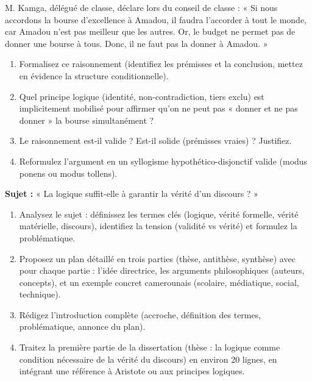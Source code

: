 \documentclass[11pt]{article}
\newcommand{\cle}[1]{{\popxbold\color{popdark}#1}}
\newcounter{popsec}
\newcounter{popsub}
\newcommand{\courssub}[1]{%
  \stepcounter{popsub}%
  \par\vspace{9pt}\noindent{\popxbold\fontsize{11.5}{13}\selectfont\color{popink}{\color{poporange}\thepopsec.\thepopsub}\hspace{6pt}#1}\par\nopagebreak\vspace{4pt}
}
\begin{document}
\begin{exercice}
M. Kamga, délégué de classe, déclare lors du conseil de classe : « Si nous accordons la bourse d'excellence à Amadou, il faudra l'accorder à tout le monde, car Amadou n'est pas meilleur que les autres. Or, le budget ne permet pas de donner une bourse à tous. Donc, il ne faut pas la donner à Amadou. »
\begin{enumerate}
    \item Formalisez ce raisonnement (identifiez les prémisses et la conclusion, mettez en évidence la structure conditionnelle).
    \item Quel principe logique (identité, non-contradiction, tiers exclu) est implicitement mobilisé pour affirmer qu'on ne peut pas « donner et ne pas donner » la bourse simultanément ?
    \item Le raisonnement est-il valide ? Est-il solide (prémisses vraies) ? Justifiez.
    \item Reformulez l'argument en un syllogisme hypothético-disjonctif valide (modus ponens ou modus tollens).
\end{enumerate}
\end{exercice}

\courssub{Je me prépare au Bac}

\begin{exercice}
\textbf{Sujet :} « La logique suffit-elle à garantir la vérité d'un discours ? »
\begin{enumerate}
    \item Analysez le sujet : définissez les termes clés (\cle{logique}, \cle{vérité formelle}, \cle{vérité matérielle}, \cle{discours}), identifiez la tension (validité vs vérité) et formulez la problématique.
    \item Proposez un plan détaillé en trois parties (thèse, antithèse, synthèse) avec pour chaque partie : l'idée directrice, les arguments philosophiques (auteurs, concepts), et un exemple concret camerounais (scolaire, médiatique, social, technique).
    \item Rédigez l'introduction complète (accroche, définition des termes, problématique, annonce du plan).
    \item Traitez la première partie de la dissertation (thèse : la logique comme condition nécessaire de la vérité du discours) en environ 20 lignes, en intégrant une référence à Aristote ou aux principes logiques.
\end{enumerate}
\end{exercice}
\end{document}
